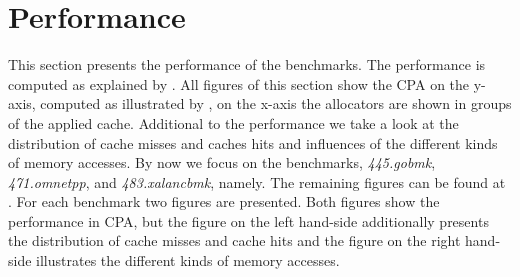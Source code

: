 \documentclass[onecolumn, openright, master, english, signatures]{dbrgrptt}
\begin{document}
\section{Performance}\label{sec:experiment-performance}

This section presents the performance of the benchmarks. The performance is computed as explained by . All figures of this section show the \ac{CPA} on the y-axis, computed as illustrated by , on the x-axis the allocators are shown in groups of the applied cache. Additional to the performance we take a look at the distribution of cache misses and caches hits and influences of the different kinds of memory accesses. By now we focus on the benchmarks, \emph{445.gobmk}, \emph{471.omnetpp}, and \emph{483.xalancbmk}, namely. The remaining figures can be found at . For each benchmark two figures are presented. Both figures show the performance in \ac{CPA}, but the figure on the left hand-side additionally presents the distribution of cache misses and cache hits and the figure on the right hand-side illustrates the different kinds of memory accesses.
\end{document}
